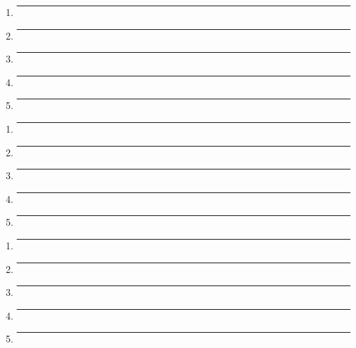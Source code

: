 \documentclass[11pt]{article}
\begin{document}
\begin{landscape}
\noindent\begin{multicols}{3}%
\begin{enumerate}[itemsep=3.1ex]
	\item \rule{2.25in}{0.4pt}
	\item \rule{2.25in}{0.4pt}
	\item \rule{2.25in}{0.4pt}
	\item \rule{2.25in}{0.4pt}
	\item \rule{2.25in}{0.4pt}
\end{enumerate}
\columnbreak
\begin{enumerate}[resume, itemsep=3.1ex]
	\item \rule{2.25in}{0.4pt}
	\item \rule{2.25in}{0.4pt}
	\item \rule{2.25in}{0.4pt}
	\item \rule{2.25in}{0.4pt}
	\item \rule{2.25in}{0.4pt}
\end{enumerate}
\columnbreak
\begin{enumerate}[resume, itemsep=3.1ex]
	\item \rule{2.25in}{0.4pt}
	\item \rule{2.25in}{0.4pt}
	\item \rule{2.25in}{0.4pt}
	\item \rule{2.25in}{0.4pt}
	\item \rule{2.25in}{0.4pt}
\end{enumerate}
\end{multicols}

\end{landscape}
\end{document}
